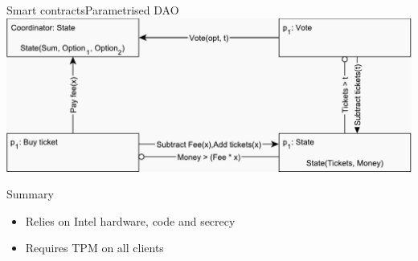 \documentclass{beamer}
\begin{document}
\begin{frame}{Smart contracts}{Parametrised DAO}
	\centering
	\includegraphics[scale=0.5]{figures/dao-parametrised.pdf}
\end{frame}

\begin{frame}{Summary}%
	\begin{itemize}
		\item Relies on Intel hardware, code and secrecy
		\item Requires TPM on all clients
	\end{itemize}
\end{frame}
\end{document}
